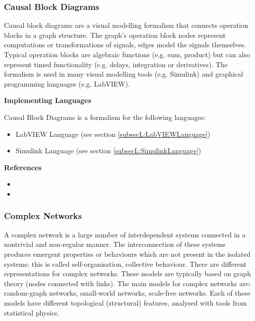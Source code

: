 \subsubsection{Causal Block Diagrams}
\label{subsecF:CausalBlockDiagrams}


Causal block diagrams are a visual modelling formalism that connects operation blocks in a graph structure.
The graph's operation block nodes represent computations or transformations of signals, edges model the signals themselves.
Typical operation blocks are algebraic functions (e.g. sum, product) but can also represent timed functionality (e.g. delays, integration or derivatives).
The formalism is used in many visual modelling tools (e.g. Simulink) and graphical programming languages (e.g. LabVIEW).

\textbf{Implementing Languages}

Causal Block Diagrams is a formalism for the following languages:
\begin{itemize}
	\item LabVIEW Language (see section \ref{subsecL:LabVIEWLanguage})
	\item Simulink Language (see section \ref{subsecL:SimulinkLanguage})
\end{itemize}





\textbf{References}
\begin{itemize}
	
\item {}
	
\item {}
\end{itemize}



\subsubsection{Complex Networks}
\label{subsecF:ComplexNetworks}


A complex network is a large number of interdependent systems connected in a nontrivial
and non-regular manner. The interconnection of these systems produces emergent properties or behaviours which are not present in the isolated systems: this is called self-organisation, collective behaviour. There are different representations for complex networks. These models are typically based on graph theory (nodes connected with links). The main models for complex networks are:  random-graph networks, small-world networks, scale-free networks. Each of these models have different topological (structural) features, analysed with tools from statistical physics.

